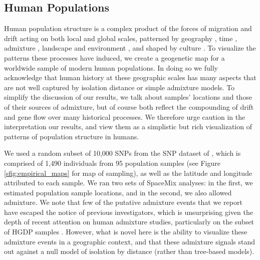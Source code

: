 \documentclass[12pt]{article}
\begin{document}
\subsection*{Human Populations}
Human population structure is a complex product of the forces of migration and drift acting on both local and global scales, patterned by geography \citep{novembre_genes_2008, ralph2013geography}, time \citep{skoglund2012origins, skoglund_investigating_2014}, admixture \citep{Hellenthal},  landscape and environment \citep{Beall2010, Bigham2010, Bradburd2013}, and shaped by culture \citep{reich_india_2009, Atzmon2010, moorjani_history_2011}. To visualize the patterns these processes have induced, we create a geogenetic map for a worldwide sample of modern human populations. In doing so we fully acknowledge that human history at these geographic scales has many aspects that are not well captured by isolation distance or simple admixture models. To simplify the discussion of our results, we talk about samples' locations and those of their sources of admixture, but of course both reflect the compounding of drift and gene flow over many historical processes.  We therefore urge caution in the interpretation our results, and view them as a simplistic but rich visualization of patterns of population structure in humans. 

We used a random subset of 10,000 SNPs from the SNP dataset of \citet{Hellenthal}, which is comprised of 1,490 individuals from 95 population samples (see Figure \ref{sfig:empirical_maps} for map of sampling), as well as the latitude and longitude attributed to each sample.  
We ran two sets of SpaceMix analyses: in the first, we estimated population sample locations, 
and in the second, we also allowed admixture. 
We note that few of the putative admixture events that we report have escaped the notice of previous investigators, 
which is unsurprising given the depth of recent attention on human admixture studies, particularly on the subset of HGDP samples 
\citep[see ][for various global analyses]{rosenberg_genetic_2002,li_worldwide_2008,Loh:13,patterson_ancient_2012,Hellenthal}. 
However, what is novel here is the ability to visualize these admixture events in a geographic context, 
and that these admixture signals stand out against a null model of isolation by distance (rather than tree-based models).
\end{document}
